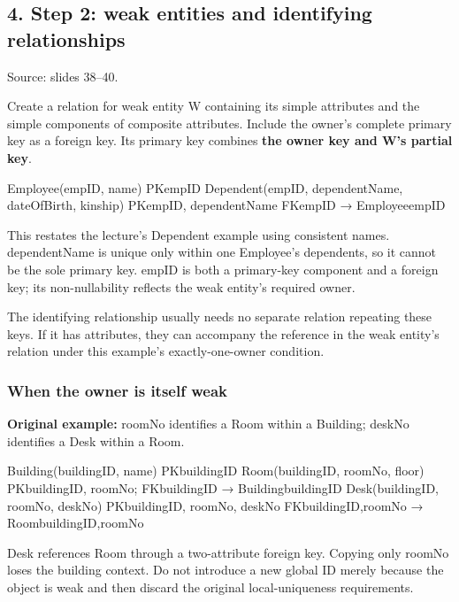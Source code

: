 \subsection{4. Step 2: weak entities and identifying relationships}\label{04_er_to_relational_mapping_en-step-2-weak-entities-and-identifying-relationships}

Source: slides 38--40.

Create a relation for weak entity W containing its simple attributes and the simple components of composite attributes. Include the owner's complete primary key as a foreign key. Its primary key combines \textbf{the owner key and W's partial key}.

\begin{StudyCode}
Employee(empID, name)                       PK{empID}
Dependent(empID, dependentName, dateOfBirth, kinship)
  PK{empID, dependentName}
  FK{empID} → Employee{empID}
\end{StudyCode}

This restates the lecture's Dependent example using consistent names. dependentName is unique only within one Employee's dependents, so it cannot be the sole primary key. empID is both a primary-key component and a foreign key; its non-nullability reflects the weak entity's required owner.

The identifying relationship usually needs no separate relation repeating these keys. If it has attributes, they can accompany the reference in the weak entity's relation under this example's exactly-one-owner condition.

\subsubsection{When the owner is itself weak}\label{04_er_to_relational_mapping_en-when-the-owner-is-itself-weak}

\textbf{Original example:} roomNo identifies a Room within a Building; deskNo identifies a Desk within a Room.

\begin{StudyCode}
Building(buildingID, name)                 PK{buildingID}
Room(buildingID, roomNo, floor)
  PK{buildingID, roomNo}; FK{buildingID} → Building{buildingID}
Desk(buildingID, roomNo, deskNo)
  PK{buildingID, roomNo, deskNo}
  FK{buildingID,roomNo} → Room{buildingID,roomNo}
\end{StudyCode}

Desk references Room through a two-attribute foreign key. Copying only roomNo loses the building context. Do not introduce a new global ID merely because the object is weak and then discard the original local-uniqueness requirements.

